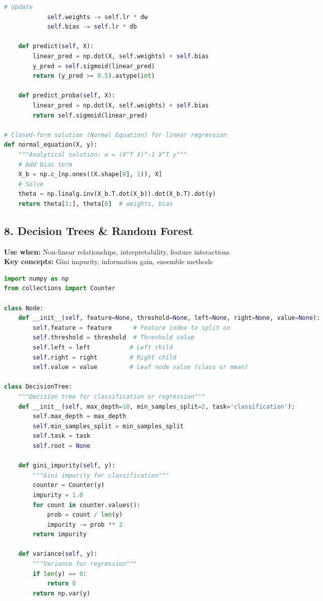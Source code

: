 \documentclass[8pt,landscape]{article}
\begin{document}
\begin{multicols}{3}
\begin{lstlisting}[language=Python]
            # Update
            self.weights -= self.lr * dw
            self.bias -= self.lr * db

    def predict(self, X):
        linear_pred = np.dot(X, self.weights) + self.bias
        y_pred = self.sigmoid(linear_pred)
        return (y_pred >= 0.5).astype(int)

    def predict_proba(self, X):
        linear_pred = np.dot(X, self.weights) + self.bias
        return self.sigmoid(linear_pred)

# Closed-form solution (Normal Equation) for linear regression
def normal_equation(X, y):
    """Analytical solution: w = (X^T X)^-1 X^T y"""
    # Add bias term
    X_b = np.c_[np.ones((X.shape[0], 1)), X]
    # Solve
    theta = np.linalg.inv(X_b.T.dot(X_b)).dot(X_b.T).dot(y)
    return theta[1:], theta[0]  # weights, bias
\end{lstlisting}

\subsection*{8. Decision Trees \& Random Forest}
\textbf{Use when:} Non-linear relationships, interpretability, feature interactions \\
\textbf{Key concepts:} Gini impurity, information gain, ensemble methods
\begin{lstlisting}[language=Python]
import numpy as np
from collections import Counter

class Node:
    def __init__(self, feature=None, threshold=None, left=None, right=None, value=None):
        self.feature = feature      # Feature index to split on
        self.threshold = threshold  # Threshold value
        self.left = left           # Left child
        self.right = right         # Right child
        self.value = value         # Leaf node value (class or mean)

class DecisionTree:
    """Decision tree for classification or regression"""
    def __init__(self, max_depth=10, min_samples_split=2, task='classification'):
        self.max_depth = max_depth
        self.min_samples_split = min_samples_split
        self.task = task
        self.root = None

    def gini_impurity(self, y):
        """Gini impurity for classification"""
        counter = Counter(y)
        impurity = 1.0
        for count in counter.values():
            prob = count / len(y)
            impurity -= prob ** 2
        return impurity

    def variance(self, y):
        """Variance for regression"""
        if len(y) == 0:
            return 0
        return np.var(y)


\end{lstlisting}
\end{multicols}
\end{document}
